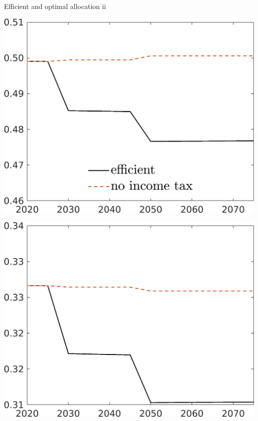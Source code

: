 \documentclass[11pt,aspectratio=169]{beamer}
\begin{document}
\begin{frame}{Efficient and optimal allocation ii }
	\centering
	\begin{minipage}[]{0.3\textwidth}
		\includegraphics[width=1\textwidth]{../codding_model/own_basedOnFried/optimalPol_elastS_DisuSci/figures/all_1705/hh_CompEffOPT_T_NoTaus_noopt_spillover0_noskill0_sep1_BN0_ineq0_red0_xgrowth0_zero0_countec0_etaa0.79_lgd1.png}
	\end{minipage}
	\begin{minipage}[]{0.3\textwidth}
		\includegraphics[width=1\textwidth]{../codding_model/own_basedOnFried/optimalPol_elastS_DisuSci/figures/all_1705/hl_CompEffOPT_T_NoTaus_noopt_spillover0_noskill0_sep1_BN0_ineq0_red0_xgrowth0_zero0_countec0_etaa0.79_lgd0.png}

\end{minipage}
\end{frame}
\end{document}
